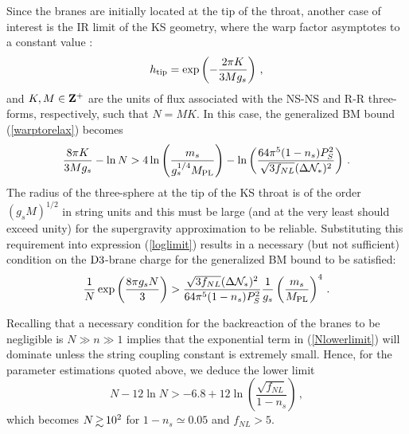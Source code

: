 Since the branes are initially located at the tip of the 
throat, another case of interest is the IR limit of the KS geometry, where 
the warp factor asymptotes to a constant value 
\cite{gkp}:
\begin{equation}
\label{KStip}
h_{\rm tip} = \exp \left( - \frac{2\pi K}{3Mg_s} \right) \,,
\end{equation}
and $K,M \in {\rm \bf Z^+}$ are the units of flux associated 
with the NS-NS and R-R three-forms, respectively, such that $N=MK$.
In this case, the generalized BM bound (\ref{warptorelax}) becomes 
\begin{equation}
\label{loglimit}
\frac{8\pi K}{3Mg_s} -\ln N > 4 \ln \left( \frac{m_s}{g_s^{1/4}M_{\mathrm{PL}}} \right)
-\ln \left( 
\frac{64\pi^5 (1-n_s)P_S^2}{\sqrt{3f_{NL}} ( \Delta {\cal{N}}_*)^2}
\right) \,.
\end{equation}
The radius of the three-sphere at the tip of the KS 
throat is of the order $(g_sM)^{1/2}$ in string units 
and this must be large (and at the very least should exceed
unity) for the supergravity approximation to be reliable. 
Substituting this requirement into expression (\ref{loglimit}) 
results in a necessary (but not sufficient) condition 
on the ${\rm D3}$-brane charge for the 
generalized BM bound to be satisfied: 
\begin{equation}
\label{Nlowerlimit}
\frac{1}{N} \exp \left( \frac{8\pi g_s N}{3}  \right)
> \frac{\sqrt{3f_{NL}} ( \Delta {\cal{N}}_*)^2}{64\pi^5 
(1-n_s)P_S^2} \frac{1}{g_s} \left( \frac{m_s}{M_{\mathrm{PL}}} \right)^4 \,.
\end{equation}

Recalling that a necessary condition for the backreaction 
of the branes to be negligible is 
$N \gg n \gg 1$ implies that the 
exponential term in (\ref{Nlowerlimit}) will dominate unless 
the string coupling constant is extremely small. Hence, for 
the parameter estimations quoted above, we 
deduce the lower limit 
\begin{equation}
\label{yetanotherconstraint}
N- 12 \ln N > -6.8 +12 \ln \left( \frac{\sqrt{f_{NL}}}{1-n_s} \right) \,,
\end{equation}
which becomes $N \, \gsim \, 10^2$ for $1-n_s \simeq 0.05$ and $f_{NL}>5$.

